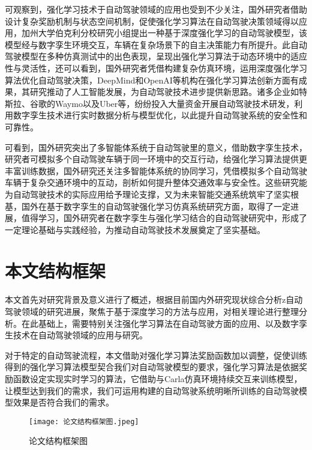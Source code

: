 可观察到，强化学习技术于自动驾驶领域的应用也受到不少关注，国外研究者借助设计复杂奖励机制与状态空间机制，促使强化学习算法在自动驾驶决策领域得以应用，加州大学伯克利分校研究小组提出一种基于深度强化学习的自动驾驶模型，该模型经与数字孪生环境交互，车辆在复杂场景下的自主决策能力有所提升。此自动驾驶模型在多种仿真测试中的出色表现，呈现出强化学习算法于动态环境中的适应性与灵活性，还可以看到，国外研究者凭借构建复杂仿真环境，运用深度强化学习算法优化自动驾驶决策，DeepMind和OpenAI等机构在强化学习算法创新方面有成果，其研究推动了人工智能发展，为自动驾驶技术进步提供新思路。诸多企业如特斯拉、谷歌的Waymo以及Uber等，纷纷投入大量资金开展自动驾驶技术研发，利用数字孪生技术进行实时数据分析与模型优化，以此提升自动驾驶系统的安全性和可靠性。

可看到，国外研究突出了多智能体系统于自动驾驶里的意义，借助数字孪生技术，研究者可模拟多个自动驾驶车辆于同一环境中的交互行动，给强化学习算法提供更丰富训练数据，国外研究还关注多智能体系统的协同学习，凭借模拟多个自动驾驶车辆于复杂交通环境中的互动，剖析如何提升整体交通效率与安全性。这些研究能为自动驾驶技术的实际应用给予理论支撑，又为未来智能交通系统筑牢了坚实根基，国外在基于数字孪生的自动驾驶强化学习仿真系统研究方面，取得了一定进展，值得学习，国外研究者在数字孪生与强化学习结合的自动驾驶研究中，形成了一定理论基础与实践经验，为推动自动驾驶技术发展奠定了坚实基础。

\section{本文结构框架}
本文首先对研究背景及意义进行了概述，根据目前国内外研究现状综合分析z自动驾驶领域的研究进展，聚焦于基于深度学习的方法与应用，对相关理论进行整理分析。在此基础上，需要特别关注强化学习算法在自动驾驶方面的应用、以及数字孪生技术在自动驾驶领域的应用与研究。

对于特定的自动驾驶流程，本文借助对强化学习算法奖励函数加以调整，促使训练得到的强化学习算法模型契合我们对自动驾驶模型的要求，强化学习算法是依据奖励函数设定实现实时学习的算法，它借助与Carla仿真环境持续交互来训练模型，让模型达到我们的需求，我们可运用构建的自动驾驶系统明晰所训练的自动驾驶模型效果是否符合我们的需求。


\begin{figure}[hbt]
	\centering
	\texttt{[image: 论文结构框架图.jpeg]}
	\caption{论文结构框架图}
	\label{f.example}
\end{figure}



\begin{tabular}{l l}
\end{tabular}


